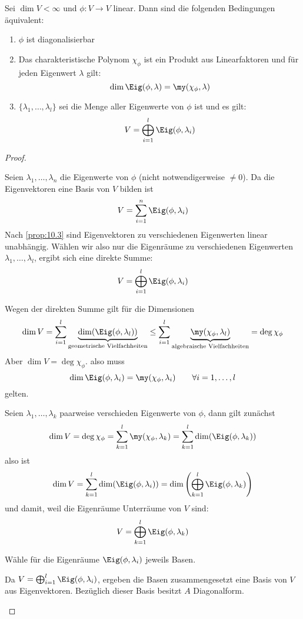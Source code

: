 \documentclass{mycourse}
\begin{document}
\begin{thm}
\label{11.3}
Sei $\dim V <\infty$ und $\phi:V \to V$ linear.
Dann sind die folgenden Bedingungen äquivalent:
\begin{enumerate}
\item $\phi$ ist diagonalisierbar
\item Das charakteristische Polynom $\chi_\phi$ ist ein Produkt aus Linearfaktoren und für jeden Eigenwert $\lambda$ gilt:
\[
\dim \Eig (\phi, \lambda) = \my(\chi_\phi,\lambda)
\]
\item $\{\lambda_1,\dotsc, \lambda_l\}$ sei die Menge aller Eigenwerte von $\phi$ ist und es gilt:
\[
V=\bigoplus_{i=1}^l \Eig(\phi, \lambda_i)
\]
\end{enumerate}

\begin{proof}
	\begin{seg}[(1)$\implies$ (3)]
Seien $\lambda_1,\dotsc, \lambda_n$ die Eigenwerte von $\phi$ (nicht notwendigerweise $\neq 0$).
Da die Eigenvektoren eine Basis von $V$ bilden ist
\[
	V = \sum_{i=1}^n \Eig(\phi,\lambda_i)
\]
Nach \ref{prop:10.3} sind Eigenvektoren zu verschiedenen Eigenwerten linear unabhängig.
Wählen wir also nur die Eigenräume zu verschiedenen Eigenwerten $\lambda_1,\dotsc,\lambda_l$, ergibt sich eine direkte Summe:
\[
V = \bigoplus_{i=1}^l \Eig(\phi,\lambda_i)
\]
\end{seg}
\begin{seg}[(3)$\implies$ (2)]
Wegen der direkten Summe gilt für die Dimensionen
\[
	\dim V = \sum_{i=1}^l\limits \underbrace{\dim ( \Eig(\phi, \lambda_l) )}_\text{geometrische Vielfachheiten} \le \sum_{i=1}^l \underbrace{\my(\chi_\phi, \lambda_l)}_{\text{algebraische Vielfachheiten}} = \deg \chi_\phi
\]
Aber $\dim V = \deg \chi_\phi$. also muss
\[
\dim  \Eig(\phi, \lambda_i) =\my(\chi_\phi, \lambda_i) \qquad \forall i=1,\dotsc,l
\]
gelten.
\end{seg}
\begin{seg}[(2) $\implies$ (3)]
Seien $\lambda_1,\dotsc,\lambda_k$ paarweise verschieden Eigenwerte von $\phi$, dann gilt zunächst
\[
	\dim V = \deg \chi_\phi = \sum_{k=1}^l \my(\chi_\phi,\lambda_k) = \sum_{k=1}^l \dim ( \Eig(\phi,\lambda_k) )
\]
also ist
\[
\dim V =\sum_{k=1}^l \dim (\Eig(\phi,\lambda_i)) = \dim\left (\bigoplus_{k=1}^l \Eig(\phi, \lambda_k)\right )
\]
und damit, weil die Eigenräume Unterräume von $V$ sind:
\[
V=\bigoplus_{k=1}^l \Eig(\phi,\lambda_k)
\]
\end{seg}
\begin{seg}[(3) $\implies$ (1)]
Wähle für die Eigenräume $\Eig(\phi,\lambda_i)$ jeweils Basen.

Da $V = \bigoplus_{i=1}^l \Eig(\phi,\lambda_i)$, ergeben die Basen zusammengesetzt eine Basis von $V$ aus Eigenvektoren.
Bezüglich dieser Basis besitzt $A$ Diagonalform.
\end{seg}
\end{proof}
\end{thm}
\end{document}
